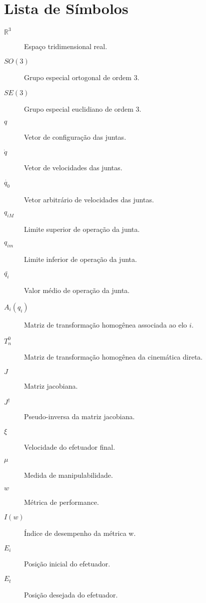 \chapter*{Lista de Símbolos}

\begin{description}
    \item[$\mathbb{R}^3$] \quad Espaço tridimensional real.
    \item[$SO(3)$] \quad Grupo especial ortogonal de ordem 3.
    \item[$SE(3)$] \quad Grupo especial euclidiano de ordem 3.
    \item[$q$] \quad Vetor de configuração das juntas.
    \item[$\dot{q}$] \quad Vetor de velocidades das juntas.
    \item[$\dot{q_0}$] \quad Vetor arbitrário de velocidades das juntas.
    \item[$q_{iM}$] \quad Limite superior de operação da junta.
    \item[$q_{im}$] \quad Limite inferior de operação da junta.
    \item[$\bar{q_{i}}$] \quad Valor médio de operação da junta.
    \item[$A_i(q_i)$] \quad Matriz de transformação homogênea associada ao elo $i$.
    \item[$T^0_n$] \quad Matriz de transformação homogênea da cinemática direta.
    \item[$J$] \quad Matriz jacobiana.
    \item[$J^\dag$] \quad Pseudo-inversa da matriz jacobiana.
    \item[$\xi$] \quad Velocidade do efetuador final.
    \item[$\mu$] \quad Medida de manipulabilidade.
    \item[$w$] \quad Métrica de performance.
    \item[$I(w)$] \quad Índice de desempenho da métrica w.
    \item[$E_i$] \quad Posição inicial do efetuador.
    \item[$E_t$] \quad Posição desejada do efetuador.
\end{description}
